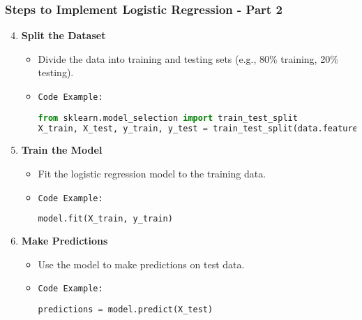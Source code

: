 \documentclass[aspectratio=169]{beamer}
\begin{document}
\begin{frame}
    \frametitle{Steps to Implement Logistic Regression - Part 2}
    \begin{enumerate}
        \setcounter{enumi}{3} %
        \item \textbf{Split the Dataset}
        \begin{itemize}
            \item Divide the data into training and testing sets (e.g., 80\% training, 20\% testing).
            \item \texttt{Code Example:}
            \begin{lstlisting}[language=Python]
from sklearn.model_selection import train_test_split
X_train, X_test, y_train, y_test = train_test_split(data.features, data.target, test_size=0.2, random_state=42)
            \end{lstlisting}
        \end{itemize}

        \item \textbf{Train the Model}
        \begin{itemize}
            \item Fit the logistic regression model to the training data.
            \item \texttt{Code Example:}
            \begin{lstlisting}[language=Python]
model.fit(X_train, y_train)
            \end{lstlisting}
        \end{itemize}

        \item \textbf{Make Predictions}
        \begin{itemize}
            \item Use the model to make predictions on test data.
            \item \texttt{Code Example:}
            \begin{lstlisting}[language=Python]
predictions = model.predict(X_test)
            \end{lstlisting}
        \end{itemize}
    \end{enumerate}
\end{frame}
\end{document}
